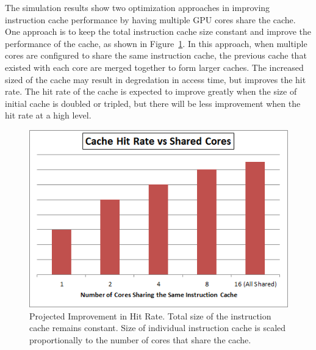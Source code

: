 
The simulation results show two optimization
approaches in improving instruction cache performance by having
multiple GPU cores share the cache. 
One approach is to keep the total instruction cache size constant and
improve the performance of the cache, as shown in
Figure~\ref{HitImprov}. 
In this approach, when multiple cores are configured to share the same
instruction cache, the previous cache that existed with each core are
merged together to form larger caches. 
The increased sized of the cache may result in degredation in access
time, but improves the hit rate. 
The hit rate of the cache is expected to improve greatly when the size
of initial cache is doubled or tripled, but there will be less
improvement when the hit rate at a high level.


\begin{figure}[t]
\centering
\includegraphics[width=\columnwidth]{graphics/HitRateImprov.png}
\caption{Projected Improvement in Hit Rate. Total size of the instruction cache remains constant. Size of individual instruction cache is scaled proportionally to the number of cores that share the cache.}
\label{HitImprov}
\end{figure}


